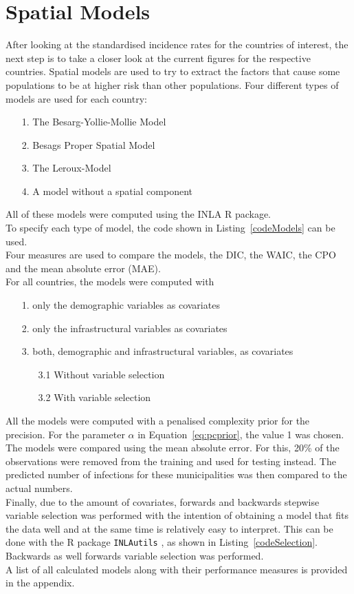 \section{Spatial Models}
After looking at the standardised incidence rates for the countries of interest, the next step is to take a closer look at the current figures for the respective countries. Spatial models are used to try to extract the factors that cause some populations to be at higher risk than other populations. Four different types of models are used for each country:
\begin{itemize}
    \item[1.] The Besarg-Yollie-Mollie Model
    \item[2.] Besags Proper Spatial Model
    \item[3.] The Leroux-Model
    \item[4.] A model without a spatial component
\end{itemize}
All of these models were computed using the INLA \cite{rinla} R package. \\
To specify each type of model, the code shown in Listing~\ref{codeModels} can be used. \\
Four measures are used to compare the models, the DIC, the WAIC, the CPO and the mean absolute error (MAE).\\
For all countries, the models were computed with
\begin{itemize}
    \item[1.] only the demographic variables as covariates
    \item[2.] only the infrastructural variables as covariates
    \item[3.] both, demographic and infrastructural variables, as covariates
    \begin{itemize}
        \item[3.1] Without variable selection
        \item[3.2] With variable selection
    \end{itemize}
\end{itemize}
All the models were computed with a penalised complexity prior for the precision. For the parameter $\alpha$ in Equation~\ref{eq:pcprior}, the value 1 was chosen. \\
The models were compared using the mean absolute error. For this, 20\% of the observations were removed from the training and used for testing instead. The predicted number of infections for these municipalities was then compared to the actual numbers.
\\
Finally, due to the amount of covariates, forwards and backwards stepwise variable selection was performed with the intention of obtaining a model that fits the data well and at the same time is relatively easy to interpret. This can be done with the R package \texttt{INLAutils} \cite{inlautils}, as shown in Listing~\ref{codeSelection}. Backwards as well forwards variable selection was performed.\\
A list of all calculated models along with their performance measures is provided in the appendix.
